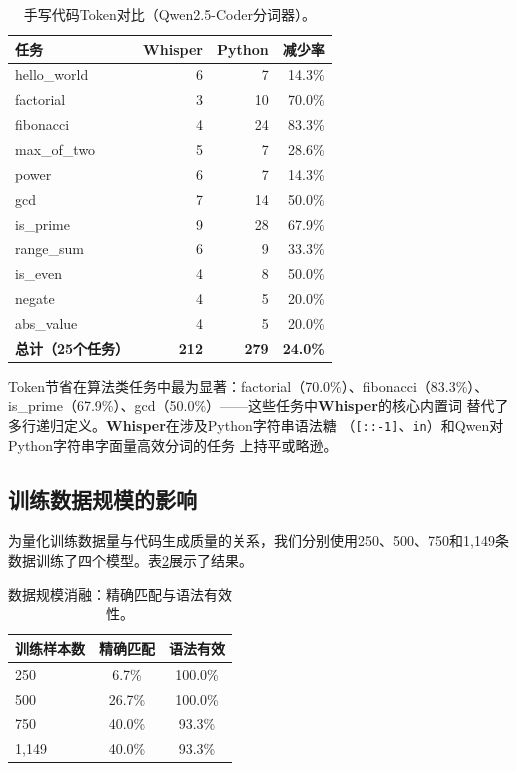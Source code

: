 \documentclass[11pt,a4paper]{ctexart}
\begin{document}
\begin{table}[ht]
\centering
\caption{手写代码Token对比（Qwen2.5-Coder分词器）。}
\label{tab:token}
\begin{tabular}{lrrr}
\toprule
\textbf{任务} & \textbf{Whisper} & \textbf{Python} & \textbf{减少率} \\
\midrule
hello\_world & 6 & 7 & 14.3\% \\
factorial & 3 & 10 & 70.0\% \\
fibonacci & 4 & 24 & 83.3\% \\
max\_of\_two & 5 & 7 & 28.6\% \\
power & 6 & 7 & 14.3\% \\
gcd & 7 & 14 & 50.0\% \\
is\_prime & 9 & 28 & 67.9\% \\
range\_sum & 6 & 9 & 33.3\% \\
is\_even & 4 & 8 & 50.0\% \\
negate & 4 & 5 & 20.0\% \\
abs\_value & 4 & 5 & 20.0\% \\
\midrule
\textbf{总计（25个任务）} & \textbf{212} & \textbf{279} & \textbf{24.0\%} \\
\bottomrule
\end{tabular}
\end{table}

Token节省在算法类任务中最为显著：factorial（70.0\%）、fibonacci（83.3\%）、
is\_prime（67.9\%）、gcd（50.0\%）——这些任务中\textbf{Whisper}的核心内置词
替代了多行递归定义。\textbf{Whisper}在涉及Python字符串语法糖
（\texttt{[::-1]}、\texttt{in}）和Qwen对Python字符串字面量高效分词的任务
上持平或略逊。

\subsection{训练数据规模的影响}

为量化训练数据量与代码生成质量的关系，我们分别使用250、500、750和1,149条
数据训练了四个模型。表\ref{tab:scaling}展示了结果。

\begin{table}[ht]
\centering
\caption{数据规模消融：精确匹配与语法有效性。}
\label{tab:scaling}
\begin{tabular}{lcc}
\toprule
\textbf{训练样本数} & \textbf{精确匹配} & \textbf{语法有效} \\
\midrule
250  & 6.7\%  & 100.0\% \\
500  & 26.7\% & 100.0\% \\
750  & 40.0\% & 93.3\%  \\
1,149 & 40.0\% & 93.3\%  \\
\bottomrule
\end{tabular}
\end{table}
\end{document}
